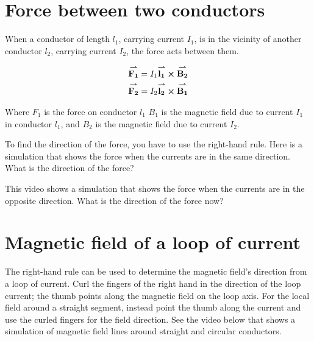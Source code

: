\documentclass{ximera}
\begin{document}
\begin{center}  
\end{center} 


\section{Force between two conductors}

When a conductor of length $l_1$, carrying current $I_1$, is in the vicinity of another conductor $l_2$, carrying current $I_2$, the force acts between them. 


\begin{eqnarray}
{\overset{\boldsymbol{\rightharpoonup}}{\mathbf{F_1}}}\hspace{0in}=I_1 {\overset{\boldsymbol{\rightharpoonup}}{\mathbf{l_1}}}\hspace{0in} \boldsymbol\times {\overset{\boldsymbol{\rightharpoonup}}{\mathbf{B_2}}}\hspace{0in} \\
{\overset{\boldsymbol{\rightharpoonup}}{\mathbf{F_2}}}\hspace{0in}=I_2 {\overset{\boldsymbol{\rightharpoonup}}{\mathbf{l_2}}}\hspace{0in} \boldsymbol\times {\overset{\boldsymbol{\rightharpoonup}}{\mathbf{B_1}}}\hspace{0in}
\end{eqnarray}

Where $F_1$ is the force on conductor $l_1$ $B_1$ is the magnetic field due to current $I_1$ in conductor $l_1$, and $B_2$ is the magnetic field due to current $I_2$.

To find the direction of the force, you have to use the right-hand rule. Here is a simulation that shows the force when the currents are in the same direction. What is the direction of the force?

\begin{center}  
\end{center} 

This video shows a simulation that shows the force when the currents are in the opposite direction. What is the direction of the force now?


\begin{center}  
\end{center} 


\section{Magnetic field of a loop of current}

The right-hand rule can be used to determine the magnetic field's direction from a loop of current. Curl the fingers of the right hand in the direction of the loop current; the thumb points along the magnetic field on the loop axis. For the local field around a straight segment, instead point the thumb along the current and use the curled fingers for the field direction. See the video below that shows a simulation of magnetic field lines around straight and circular conductors.
\end{document}
